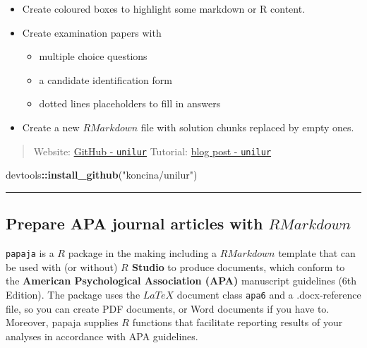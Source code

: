 \documentclass[]{book}
\newenvironment{Shaded}{\begin{snugshade}}{\end{snugshade}}
\newcommand{\KeywordTok}[1]{\textcolor[rgb]{0.13,0.29,0.53}{\textbf{#1}}}
\newcommand{\StringTok}[1]{\textcolor[rgb]{0.31,0.60,0.02}{#1}}
\newcommand{\OperatorTok}[1]{\textcolor[rgb]{0.81,0.36,0.00}{\textbf{#1}}}
\newcommand{\NormalTok}[1]{#1}
\providecommand{\tightlist}{%
  \setlength{\itemsep}{0pt}\setlength{\parskip}{0pt}}
\theoremstyle{definition}
\theoremstyle{definition}
\theoremstyle{definition}
\theoremstyle{remark}
\begin{document}
\begin{itemize}
\item
  Create coloured boxes to highlight some markdown or R content.
\item
  Create examination papers with

  \begin{itemize}
  \tightlist
  \item
    multiple choice questions
  \item
    a candidate identification form
  \item
    dotted lines placeholders to fill in answers
  \end{itemize}
\item
  Create a new \(R Markdown\) file with solution chunks replaced by
  empty ones.
\end{itemize}

\begin{quote}
Website: \href{https://github.com/koncina/unilur}{GitHub -
\texttt{unilur}} Tutorial:
\href{http://eric.koncina.eu/posts/introducing-the-unilur-rmarkdown-template/}{blog
post - \texttt{unilur}}
\end{quote}

\begin{Shaded}
\begin{Highlighting}[]
\NormalTok{devtools}\OperatorTok{::}\KeywordTok{install_github}\NormalTok{(}\StringTok{"koncina/unilur"}\NormalTok{)}
\end{Highlighting}
\end{Shaded}

\begin{center}\rule{0.5\linewidth}{\linethickness}\end{center}

\subsection{\texorpdfstring{Prepare APA journal articles with
\(R Markdown\)}{Prepare APA journal articles with R Markdown}}\label{prepare-apa-journal-articles-with-r-markdown}

\texttt{papaja} is a \(R\) package in the making including a
\(R Markdown\) template that can be used with (or without) \textbf{\(R\)
Studio} to produce documents, which conform to the \textbf{American
Psychological Association (APA)} manuscript guidelines (6th Edition).
The package uses the \(LaTeX\) document class \texttt{apa6} and a
.docx-reference file, so you can create PDF documents, or Word documents
if you have to. Moreover, papaja supplies \(R\) functions that
facilitate reporting results of your analyses in accordance with APA
guidelines.
\end{document}
